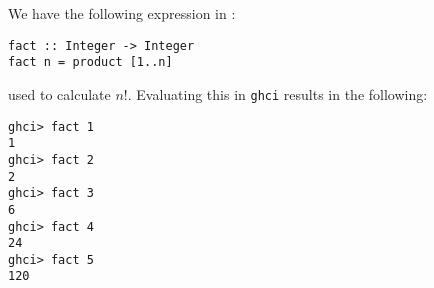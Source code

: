 
We have the following expression in :
\begin{verbatim}
fact :: Integer -> Integer
fact n = product [1..n]
\end{verbatim}
used to calculate $n!$. Evaluating this in \verb|ghci| results in the 
following:
\begin{verbatim}
ghci> fact 1
1
ghci> fact 2
2
ghci> fact 3
6
ghci> fact 4
24
ghci> fact 5
120
\end{verbatim}
